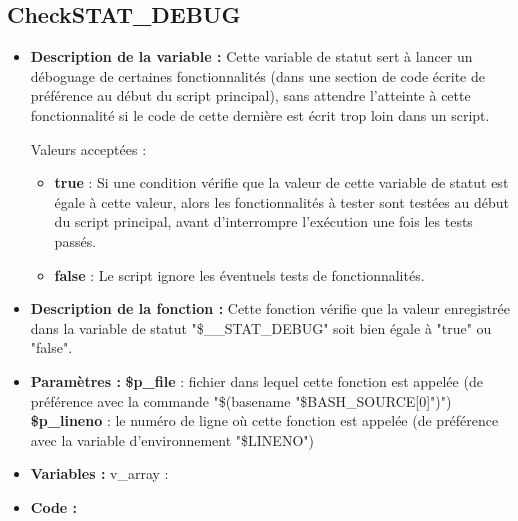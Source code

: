 \documentclass[a4paper,10pt]{article}
\begin{document}
\color{green}
\subsection{CheckSTAT\_DEBUG}\color{white}
\begin{itemize}
    \item \textbf{Description de la variable :} Cette variable de statut sert à lancer un déboguage de certaines fonctionnalités (dans une section de code écrite de préférence au début du script principal), sans attendre l'atteinte à cette fonctionnalité si le code de cette dernière est écrit trop loin dans un script.
    
    Valeurs acceptées :
    \begin{itemize}
        \item \textbf{true} : Si une condition vérifie que la valeur de cette variable de statut est égale à cette valeur, alors les fonctionnalités à tester sont testées au début du script principal, avant d'interrompre l'exécution une fois les tests passés.
        \item \textbf{false} : Le script ignore les éventuels tests de fonctionnalités. 
    \end{itemize}

    \item \textbf{Description de la fonction :} Cette fonction vérifie que la valeur enregistrée dans la variable de statut "\$\_\_STAT\_DEBUG" soit bien égale à "true" ou "false".

    \item \textbf{Paramètres :}
        \color{orange}\textbf{\$p\_file}\color{white} : fichier dans lequel cette fonction est appelée (de préférence avec la commande "\$(\color{gray}basename \color{white}"\color{orange}\$BASH\_SOURCE[0]\color{white}")")
    \color{orange}\textbf{\$p\_lineno}\color{white} : le numéro de ligne où cette fonction est appelée (de préférence avec la variable d'environnement "\color{orange}\$LINENO\color{white}")

    \item \textbf{Variables :} v\_array :

    \item \textbf{Code :}
\end{itemize}

\color{green}
\end{document}
